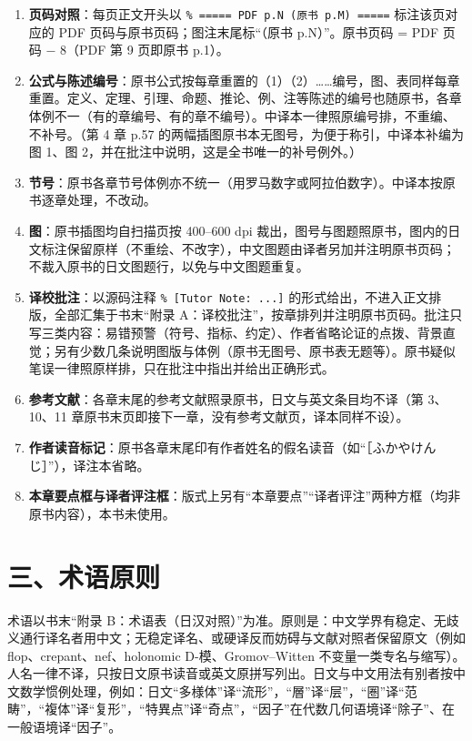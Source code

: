 \begin{enumerate}[label=\arabic*.,leftmargin=2.2em,itemsep=2pt]
  \item \textbf{页码对照}：每页正文开头以 \texttt{\% ===== PDF p.N (原书 p.M) =====} 标注该页对应的 PDF 页码与原书页码；图注末尾标“（原书 p.N）”。原书页码 = PDF 页码 − 8（PDF 第 9 页即原书 p.1）。
  \item \textbf{公式与陈述编号}：原书公式按每章重置的（1）（2）……编号，图、表同样每章重置。定义、定理、引理、命题、推论、例、注等陈述的编号也随原书，各章体例不一（有的章编号、有的章不编号）。中译本一律照原编号排，不重编、不补号。（第 4 章 p.57 的两幅插图原书本无图号，为便于称引，中译本补编为图 1、图 2，并在批注中说明，这是全书唯一的补号例外。）
  \item \textbf{节号}：原书各章节号体例亦不统一（用罗马数字或阿拉伯数字）。中译本按原书逐章处理，不改动。
  \item \textbf{图}：原书插图均自扫描页按 400--600 dpi 裁出，图号与图题照原书，图内的日文标注保留原样（不重绘、不改字），中文图题由译者另加并注明原书页码；不裁入原书的日文图题行，以免与中文图题重复。
  \item \textbf{译校批注}：以源码注释 \texttt{\% [Tutor Note: ...]} 的形式给出，不进入正文排版，全部汇集于书末“附录 A：译校批注”，按章排列并注明原书页码。批注只写三类内容：易错预警（符号、指标、约定）、作者省略论证的点拨、背景直觉；另有少数几条说明图版与体例（原书无图号、原书表无题等）。原书疑似笔误一律照原样排，只在批注中指出并给出正确形式。
  \item \textbf{参考文献}：各章末尾的参考文献照录原书，日文与英文条目均不译（第 3、10、11 章原书末页即接下一章，没有参考文献页，译本同样不设）。
  \item \textbf{作者读音标记}：原书各章末尾印有作者姓名的假名读音（如“［ふかやけんじ］”），译注本省略。
  \item \textbf{本章要点框与译者评注框}：版式上另有“本章要点”“译者评注”两种方框（均非原书内容），本书未使用。
\end{enumerate}

\section*{三、术语原则}

术语以书末“附录 B：术语表（日汉对照）”为准。原则是：中文学界有稳定、无歧义通行译名者用中文；无稳定译名、或硬译反而妨碍与文献对照者保留原文（例如 flop、crepant、nef、holonomic D-模、Gromov--Witten 不变量一类专名与缩写）。人名一律不译，只按日文原书读音或英文原拼写列出。日文与中文用法有别者按中文数学惯例处理，例如：日文“多様体”译“流形”，“層”译“层”，“圏”译“范畴”，“複体”译“复形”，“特異点”译“奇点”，“因子”在代数几何语境译“除子”、在一般语境译“因子”。

